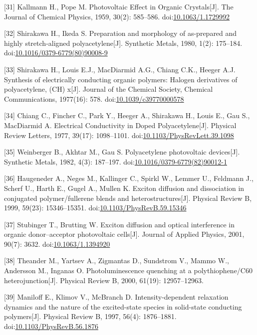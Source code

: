 \documentclass[12pt,]{report}
\begin{document}
{[}31{]} Kallmann H., Pope M. Photovoltaic Effect in Organic
Crystals{[}J{]}. The Journal of Chemical Physics, 1959, 30(2): 585--586.
doi:\href{http://dx.doi.org/10.1063/1.1729992}{10.1063/1.1729992}

{[}32{]} Shirakawa H., Ikeda S. Preparation and morphology of
as-prepared and highly stretch-aligned polyacetylene{[}J{]}. Synthetic
Metals, 1980, 1(2): 175--184.
doi:\href{http://dx.doi.org/10.1016/0379-6779(80)90008-9}{10.1016/0379-6779(80)90008-9}

{[}33{]} Shirakawa H., Louis E.J., MacDiarmid A.G., Chiang C.K., Heeger
A.J. Synthesis of electrically conducting organic polymers: Halogen
derivatives of polyacetylene, (CH) x{[}J{]}. Journal of the Chemical
Society, Chemical Communications, 1977(16): 578.
doi:\href{http://dx.doi.org/10.1039/c39770000578}{10.1039/c39770000578}

{[}34{]} Chiang C., Fincher C., Park Y., Heeger A., Shirakawa H., Louis
E., Gau S., MacDiarmid A. Electrical Conductivity in Doped
Polyacetylene{[}J{]}. Physical Review Letters, 1977, 39(17): 1098--1101.
doi:\href{http://dx.doi.org/10.1103/PhysRevLett.39.1098}{10.1103/PhysRevLett.39.1098}

{[}35{]} Weinberger B., Akhtar M., Gau S. Polyacetylene photovoltaic
devices{[}J{]}. Synthetic Metals, 1982, 4(3): 187--197.
doi:\href{http://dx.doi.org/10.1016/0379-6779(82)90012-1}{10.1016/0379-6779(82)90012-1}

{[}36{]} Haugeneder A., Neges M., Kallinger C., Spirkl W., Lemmer U.,
Feldmann J., Scherf U., Harth E., Gugel A., Mullen K. Exciton diffusion
and dissociation in conjugated polymer/fullerene blends and
heterostructures{[}J{]}. Physical Review B, 1999, 59(23): 15346--15351.
doi:\href{http://dx.doi.org/10.1103/PhysRevB.59.15346}{10.1103/PhysRevB.59.15346}

{[}37{]} Stubinger T., Brutting W. Exciton diffusion and optical
interference in organic donor--acceptor photovoltaic cells{[}J{]}.
Journal of Applied Physics, 2001, 90(7): 3632.
doi:\href{http://dx.doi.org/10.1063/1.1394920}{10.1063/1.1394920}

{[}38{]} Theander M., Yartsev A., Zigmantas D., Sundstrom V., Mammo W.,
Andersson M., Inganas O. Photoluminescence quenching at a
polythiophene/C60 heterojunction{[}J{]}. Physical Review B, 2000,
61(19): 12957--12963.

{[}39{]} Maniloff E., Klimov V., McBranch D. Intensity-dependent
relaxation dynamics and the nature of the excited-state species in
solid-state conducting polymers{[}J{]}. Physical Review B, 1997, 56(4):
1876--1881.
doi:\href{http://dx.doi.org/10.1103/PhysRevB.56.1876}{10.1103/PhysRevB.56.1876}
\end{document}

